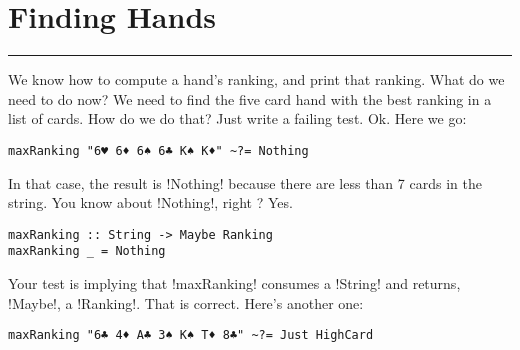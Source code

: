 \newpage
\section{Finding Hands} 
\vspace{10cm}
\hrule

\lhQ We know how to compute a hand's ranking, and print that ranking. What do we need to do now?
\lhA We need to find the five card hand with the best ranking in a list of cards.
\lhN How do we do that?
\lhA Just write a failing test.
\lhN Ok. Here we go:
\begin{lstlisting}[frame=single]
maxRanking "6♥ 6♦ 6♠ 6♣ K♠ K♦" ~?= Nothing
\end{lstlisting}
In that case, the result is \il!Nothing! because there are less than 7 cards in the string. You know about \il!Nothing!, right ?
\lhA \error Yes. 
\begin{lstlisting}[frame=single]
maxRanking :: String -> Maybe Ranking
maxRanking _ = Nothing
\end{lstlisting}
\success Your test is implying that \il!maxRanking! consumes a \il!String! and returns, \il!Maybe!, a \il!Ranking!. 
\lhN That is correct. Here's another one:
\begin{lstlisting}[frame=single]
maxRanking "6♣ 4♦ A♣ 3♠ K♠ T♦ 8♣" ~?= Just HighCard
\end{lstlisting}


